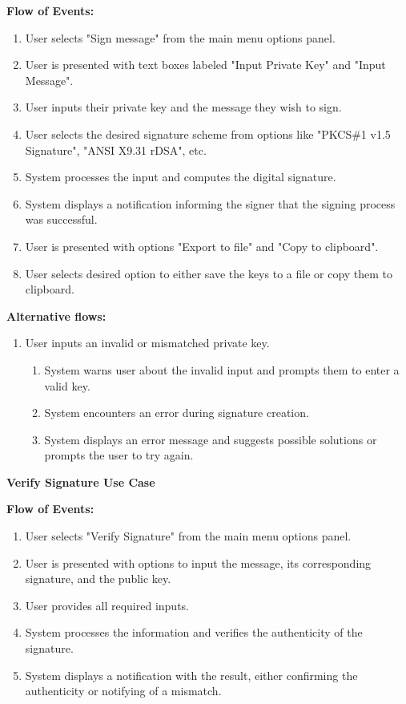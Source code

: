 \documentclass[]{final_report}
\theoremstyle{definition}
\begin{document}
\noindent\textbf{Flow of Events:}
\begin{enumerate}
    \item User selects "Sign message" from the main menu options panel.
    \item User is presented with text boxes labeled "Input Private Key" and "Input Message".
    \item User inputs their private key and the message they wish to sign.
    \item User selects the desired signature scheme from options like "PKCS\#1 v1.5 Signature", "ANSI X9.31 rDSA", etc.
    \item System processes the input and computes the digital signature.
    \item System displays a notification informing the signer that the signing process was successful.
    \item User is presented with options "Export to file" and "Copy to clipboard".
    \item User selects desired option to either save the keys to a file or copy them to clipboard.
\end{enumerate}

\noindent\textbf{Alternative flows:}
\begin{enumerate}
    \item User inputs an invalid or mismatched private key.
    \begin{enumerate}
        \item System warns user about the invalid input and prompts them to enter a valid key.
        \item System encounters an error during signature creation.
        \item System displays an error message and suggests possible solutions or prompts the user to try again.
    \end{enumerate}
\end{enumerate}

\textbf{Verify Signature Use Case}

\noindent\textbf{Flow of Events:}
\begin{enumerate}
    \item User selects "Verify Signature" from the main menu options panel.
    \item User is presented with options to input the message, its corresponding signature, and the public key.
    \item User provides all required inputs.
    \item System processes the information and verifies the authenticity of the signature.
    \item System displays a notification with the result, either confirming the authenticity or notifying of a mismatch.
\end{enumerate}
\end{document}
